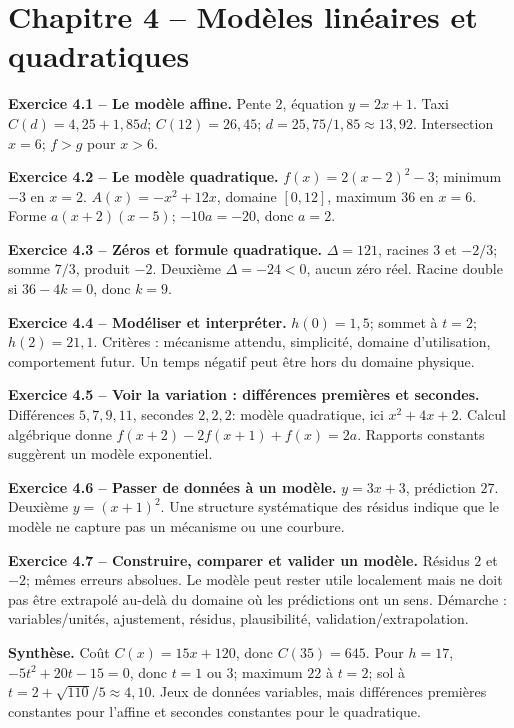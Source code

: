 \documentclass[11pt,a4paper,openany]{book}
\begin{document}
\chapter*{Chapitre 4 -- Modèles linéaires et quadratiques}
\begin{answerbox}
\textbf{Exercice 4.1 -- Le modèle affine.} Pente $2$, équation $y=2x+1$. Taxi $C(d)=4{,}25+1{,}85d$; $C(12)=26{,}45$; $d=25{,}75/1{,}85\approx13{,}92$. Intersection $x=6$; $f>g$ pour $x>6$.\par
\textbf{Exercice 4.2 -- Le modèle quadratique.} $f(x)=2(x-2)^2-3$; minimum $-3$ en $x=2$. $A(x)=-x^2+12x$, domaine $[0,12]$, maximum $36$ en $x=6$. Forme $a(x+2)(x-5)$; $-10a=-20$, donc $a=2$.\par
\textbf{Exercice 4.3 -- Zéros et formule quadratique.} $\Delta=121$, racines $3$ et $-2/3$; somme $7/3$, produit $-2$. Deuxième $\Delta=-24<0$, aucun zéro réel. Racine double si $36-4k=0$, donc $k=9$.\par
\textbf{Exercice 4.4 -- Modéliser et interpréter.} $h(0)=1{,}5$; sommet à $t=2$; $h(2)=21{,}1$. Critères : mécanisme attendu, simplicité, domaine d'utilisation, comportement futur. Un temps négatif peut être hors du domaine physique.\par
\textbf{Exercice 4.5 -- Voir la variation : différences premières et secondes.} Différences $5,7,9,11$, secondes $2,2,2$: modèle quadratique, ici $x^2+4x+2$. Calcul algébrique donne $f(x+2)-2f(x+1)+f(x)=2a$. Rapports constants suggèrent un modèle exponentiel.\par
\textbf{Exercice 4.6 -- Passer de données à un modèle.} $y=3x+3$, prédiction $27$. Deuxième $y=(x+1)^2$. Une structure systématique des résidus indique que le modèle ne capture pas un mécanisme ou une courbure.\par
\textbf{Exercice 4.7 -- Construire, comparer et valider un modèle.} Résidus $2$ et $-2$; mêmes erreurs absolues. Le modèle peut rester utile localement mais ne doit pas être extrapolé au-delà du domaine où les prédictions ont un sens. Démarche : variables/unités, ajustement, résidus, plausibilité, validation/extrapolation.\par
\medskip\textbf{Synthèse.} Coût $C(x)=15x+120$, donc $C(35)=645$. Pour $h=17$, $-5t^2+20t-15=0$, donc $t=1$ ou $3$; maximum $22$ à $t=2$; sol à $t=2+\sqrt{110}/5\approx4{,}10$. Jeux de données variables, mais différences premières constantes pour l'affine et secondes constantes pour le quadratique.
\end{answerbox}
\end{document}
